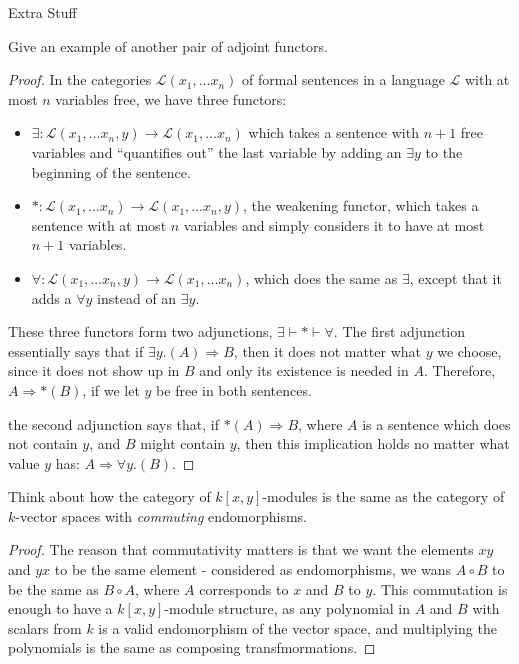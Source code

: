 \documentclass[12pt]{article}
\theoremstyle{definition}
\newenvironment{problem}[2][Problem]{\begin{trivlist}
\item[\hskip \labelsep {\bfseries #1}\hskip \labelsep {\bfseries #2.}]}{\end{trivlist}}
\begin{document}
\begin{section}{Extra Stuff}
	\begin{problem}{2}
		Give an example of another pair of adjoint functors.
	\end{problem}
	\begin{proof}
		In the categories $\mathcal{L}(x_1, \dots x_n)$ of formal sentences in a language $\mathcal{L}$ with at most $n$ variables free, we have three functors: 
		\begin{itemize}
			\item $\exists : \mathcal{L}(x_1, \dots x_n, y) \to \mathcal{L}(x_1, \dots x_n)$ which takes a sentence with $n+1$ free variables and ``quantifies out'' the last variable by adding an $\exists y$ to the beginning of the sentence.
			\item $* : \mathcal{L}(x_1, \dots x_n) \to \mathcal{L}(x_1, \dots x_n, y)$, the weakening functor, which takes a sentence with at most $n$ variables and simply considers it to have at most $n+1$ variables.
			\item $\forall : \mathcal{L}(x_1, \dots x_n, y) \to \mathcal{L}(x_1, \dots x_n)$, which does the same as $\exists$, except that it adds a $\forall y$ instead of an $\exists y$.
		\end{itemize}
		These three functors form two adjunctions, $\exists \vdash * \vdash \forall$. The first adjunction essentially says that if $\exists y.(A) \Rightarrow B$, then it does not matter what $y$ we choose, since it does not show up in $B$ and only its existence is needed in $A$. Therefore, $A \Rightarrow *(B)$, if we let $y$ be free in both sentences.
		\par the second adjunction says that, if $*(A) \Rightarrow B$, where $A$ is a sentence which does not contain $y$, and $B$ might contain $y$, then this implication holds no matter what value $y$ has: $A \Rightarrow \forall y.(B)$.
	\end{proof}
	\begin{problem}{3}
		Think about how the category of $k\left[ x,y \right]$-modules is the same as the category of $k$-vector spaces with \textit{commuting} endomorphisms.
	\end{problem}
	\begin{proof}
		The reason that commutativity matters is that we want the elements $xy$ and $yx$ to be the same element - considered as endomorphisms, we wans $A \circ B$ to be the same as $B \circ A$, where $A$ corresponds to $x$ and $B$ to $y$. This commutation is enough to have a $k[x,y]$-module structure, as any polynomial in $A$ and $B$ with scalars from $k$ is a valid endomorphism of the vector space, and multiplying the polynomials is the same as composing transfmormations. 

\end{proof}
\end{section}
\end{document}
